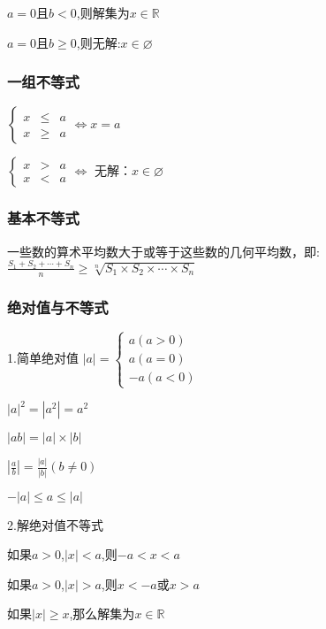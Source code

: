 \documentclass[UTF8]{ctexart}
\begin{document}
$a=0$且$b< 0$,则解集为$x\in \mathbb{R}$

$a=0$且$b\ge 0$,则无解:$x\in \varnothing$ 

\subsubsection{一组不等式}

$\left\{\begin{matrix}
 x & \le  &a \\
 x & \ge  &a
\end{matrix}\right.\Leftrightarrow    x=a$

$\left\{\begin{matrix}
 x & >  &a \\
 x & <  &a
\end{matrix}\right.\Leftrightarrow$   无解：$x\in \varnothing$ 

\subsubsection{基本不等式}

一些数的算术平均数大于或等于这些数的几何平均数，即:
$\frac{S_{1}+S_{2}+\cdots +S_{n}}{n}  \ge \sqrt[n]{S_{1}\times S_{2}\times \cdots \times S_{n}}$ 

\subsubsection{绝对值与不等式}

1.简单绝对值
$\left | a \right | =
\begin{cases}a(a> 0)
 \\a(a=0)
 \\-a(a< 0)

\end{cases}$

$\left | a \right | ^2=\left | a^2 \right | =a^2$

$\left | ab \right | =\left | a \right | \times \left | b \right | $

$\left | \frac{a}{b}  \right | =\frac{\left | a \right | }{\left | b \right | } (b\ne 0)$

$-\left | a \right | \le a\le \left | a \right | $

2.解绝对值不等式

如果$a> 0$,$\left | x \right | < a$,则$-a< x< a$

如果$a> 0$,$\left | x \right | > a$,则$x< -a$或$x> a$

如果$\left | x \right | \ge x$,那么解集为$x\in \mathbb{R}$
\end{document}
